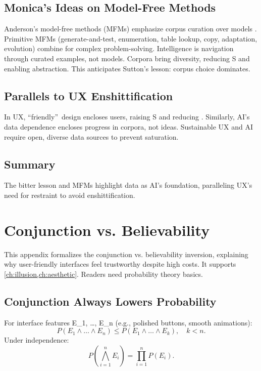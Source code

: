 \documentclass[openany]{book}
\newcommand{\Sent}{S} %
\newcommand{\Auton}{\mathcal{A}} %
\begin{document}
\section{Monica's Ideas on Model-Free Methods}
\label{sec:monica-mfm}
Anderson's model-free methods (MFMs) emphasize corpus curation over models \citep{anderson2014}. Primitive MFMs (generate-and-test, enumeration, table lookup, copy, adaptation, evolution) combine for complex problem-solving. Intelligence is navigation through curated examples, not models. Corpora bring diversity, reducing \Sent{} and enabling abstraction. This anticipates Sutton's lesson: corpus choice dominates.

\section{Parallels to UX Enshittification}
\label{sec:ai-ux-parallels}
In UX, \textquotedblleft friendly\textquotedblright\ design encloses users, raising \Sent{} and reducing \Auton{}. Similarly, AI's data dependence encloses progress in corpora, not ideas. Sustainable UX and AI require open, diverse data sources to prevent saturation.

\section{Summary}
The bitter lesson and MFMs highlight data as AI's foundation, paralleling UX's need for restraint to avoid enshittification.

\chapter{Conjunction vs. Believability}
\label{app:conjunction}

This appendix formalizes the conjunction vs. believability inversion, explaining why user-friendly interfaces feel trustworthy despite high costs. It supports \cref{ch:illusion,ch:aesthetic}. Readers need probability theory basics.

\section{Conjunction Always Lowers Probability}
\label{sec:conj-prob}
For interface features E_1, \dots, E_n (e.g., polished buttons, smooth animations):
\begin{equation}
\label{eq:conj-prob}
P(E_1 \land \dots \land E_n) \leq P(E_1 \land \dots \land E_k), \quad k < n.
\end{equation}
Under independence:
\begin{equation}
\label{eq:conj-indep}
P(\bigwedge_{i=1}^n E_i) = \prod_{i=1}^n P(E_i).
\end{equation}
\end{document}
